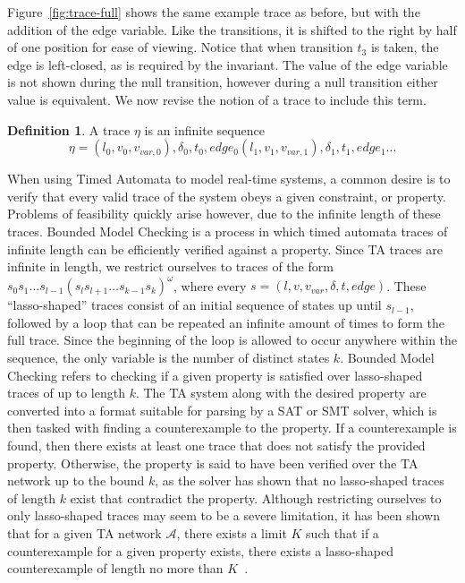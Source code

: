 \documentclass[a4paper,11pt]{report}
\theoremstyle{definition}
\newtheorem{defn}{Definition}[section]
\begin{document}
Figure~\ref{fig:trace-full} shows the same example trace as before, but with the
addition of the edge variable. Like the transitions, it is shifted to the right
by half of one position for ease of viewing. Notice that when transition $t_{3}$
is taken, the edge is left-closed, as is required by the invariant. The value of
the edge variable is not shown during the null transition, however during a null
transition either value is equivalent. We now revise the notion of a trace to
include this term.
\begin{defn} A trace $\eta$ is an infinite sequence
  \[\eta = (l_{0},v_{0},v_{var,0}),\delta_{0},t_{0},edge_{0}(l_{1},v_{1},v_{var,1}),\delta_{1},t_{1},edge_{1} \ldots\]
\end{defn}

When using Timed Automata to model real-time systems, a common desire is to
verify that every valid trace of the system obeys a given constraint, or
property. Problems of feasibility quickly arise however, due to the infinite
length of these traces. Bounded Model Checking is a process in which timed
automata traces of infinite length can be efficiently verified against a
property. Since TA traces are infinite in length, we restrict ourselves to
traces of the form
\(s_0 s_1\ldots s_{l-1}{(s_l s_{l+1}\ldots s_{k-1}s_k)}^\omega\), where every
$s = (l,v,v_{var},\delta,t,edge)$. These ``lasso-shaped'' traces consist of an
initial sequence of states up until \(s_{l-1}\), followed by a loop that can be
repeated an infinite amount of times to form the full trace. Since the beginning
of the loop is allowed to occur anywhere within the sequence, the only variable
is the number of distinct states \(k\). Bounded Model Checking refers to
checking if a given property is satisfied over lasso-shaped traces of up to
length \(k\). The TA system along with the desired property are converted into a
format suitable for parsing by a SAT or SMT solver, which is then tasked with
finding a counterexample to the property. If a counterexample is found, then
there exists at least one trace that does not satisfy the provided property.
Otherwise, the property is said to have been verified over the TA network up to
the bound \(k\), as the solver has shown that no lasso-shaped traces of length
\(k\) exist that contradict the property. Although restricting ourselves to only
lasso-shaped traces may seem to be a severe limitation, it has been shown that
for a given TA network $\mathcal{A}$, there exists a limit $K$ such that if a
counterexample for a given property exists, there exists a lasso-shaped
counterexample of length no more than $K$~\cite{biere99}.
\end{document}
